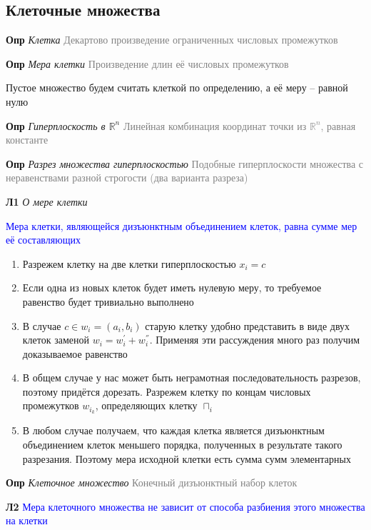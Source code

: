 \subsection{Клеточные множества}

\textbf{Опр} \textit{Клетка} \textcolor{gray}{Декартово произведение ограниченных числовых промежутков}

\textbf{Опр} \textit{Мера клетки} \textcolor{gray}{Произведение длин её числовых промежутков}

Пустое множество будем считать клеткой по определению, а её меру -- равной нулю

\textbf{Опр} \textit{Гиперплоскость в $\mathbb{R}^n$} \textcolor{gray}{Линейная комбинация координат точки
из $\mathbb{R}^n$, равная константе}

\textbf{Опр} \textit{Разрез множества гиперплоскостью} \textcolor{gray}{Подобные гиперплоскости
множества с неравенствами разной строгости (два варианта разреза)}

\textbf{Л1} \textit{О мере клетки}

\textcolor{blue}{Мера клетки, являющейся дизъюнктным объединением клеток, равна сумме мер её составляющих}

\begin{enumerate}
    \item Разрежем клетку на две клетки гиперплоскостью $x_i = c$
    \item Если одна из новых клеток будет иметь нулевую меру, то требуемое равенство будет тривиально выполнено
    \item В случае $c \in w_i = (a_i, b_i)$ старую клетку удобно представить в виде двух клеток заменой $w_i = w^{'}_i + w^{''}_i$.
    Применяя эти рассуждения много раз получим доказываемое равенство
    \item В общем случае у нас может быть неграмотная последовательность разрезов, поэтому придётся дорезать.
    Разрежем клетку по концам числовых промежутков $w_{i_k}$, определяющих клетку $\sqcap_i$
    \item В любом случае получаем, что каждая клетка является дизъюнктным объединением клеток меньшего порядка,
    полученных в результате такого разрезания.
    Поэтому мера исходной клетки есть сумма сумм элементарных
\end{enumerate}

\textbf{Опр} \textit{Клеточное множество} \textcolor{gray}{Конечный дизъюнктный набор клеток}

\textbf{Л2} \textcolor{blue}{Мера клеточного множества не зависит от способа разбиения этого множества на клетки}

